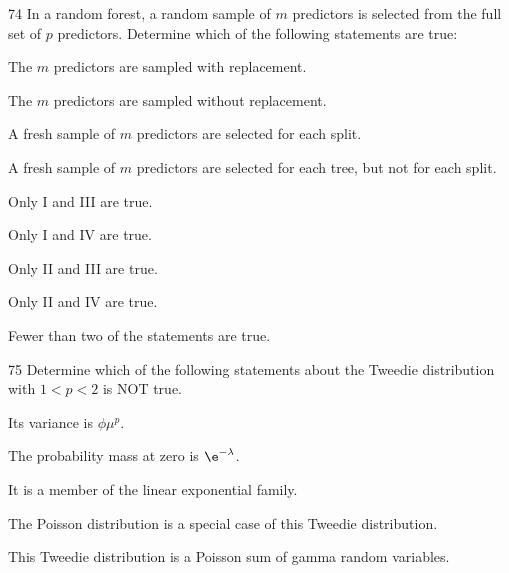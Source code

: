 \begin{question}{74}
In a random forest, a random sample of $m$ predictors is selected from the full set of $p$ predictors. Determine which of the following statements are true:

\begin{statements}
\item The $m$ predictors are sampled with replacement.
\item The $m$ predictors are sampled without replacement.
\item A fresh sample of $m$ predictors are selected for each split.
\item A fresh sample of $m$ predictors are selected for each tree, but not for each split.
\end{statements}

\begin{choices}
\item Only I and III are true.
\item Only I and IV are true.
\item Only II and III are true.
\item Only II and IV are true.
\item Fewer than two of the statements are true.
\end{choices}
\end{question}

\begin{question}{75}
Determine which of the following statements about the Tweedie distribution with $1 < p < 2$ is NOT true.

\begin{choices}
\item Its variance is $\phi \mu^p$.
\item The probability mass at zero is $\e^{-\lambda}$.
\item It is a member of the linear exponential family.
\item The Poisson distribution is a special case of this Tweedie distribution.
\item This Tweedie distribution is a Poisson sum of gamma random variables.
\end{choices}
\end{question}